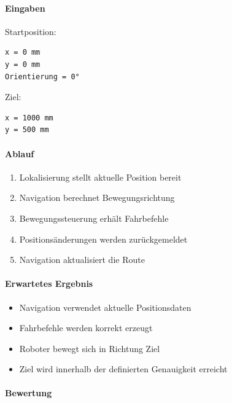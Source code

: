 \paragraph{Eingaben}\label{eingaben-10}

Startposition:

\begin{verbatim}
x = 0 mm
y = 0 mm
Orientierung = 0°
\end{verbatim}

Ziel:

\begin{verbatim}
x = 1000 mm
y = 500 mm
\end{verbatim}

\paragraph{Ablauf}\label{ablauf-10}

\begin{enumerate}
\def\labelenumi{\arabic{enumi}.}
\tightlist
\item
  Lokalisierung stellt aktuelle Position bereit
\item
  Navigation berechnet Bewegungsrichtung
\item
  Bewegungssteuerung erhält Fahrbefehle
\item
  Positionsänderungen werden zurückgemeldet
\item
  Navigation aktualisiert die Route
\end{enumerate}

\paragraph{Erwartetes Ergebnis}\label{erwartetes-ergebnis-10}

\begin{itemize}
\tightlist
\item
  Navigation verwendet aktuelle Positionsdaten
\item
  Fahrbefehle werden korrekt erzeugt
\item
  Roboter bewegt sich in Richtung Ziel
\item
  Ziel wird innerhalb der definierten Genauigkeit erreicht
\end{itemize}

\paragraph{Bewertung}\label{bewertung-10}

